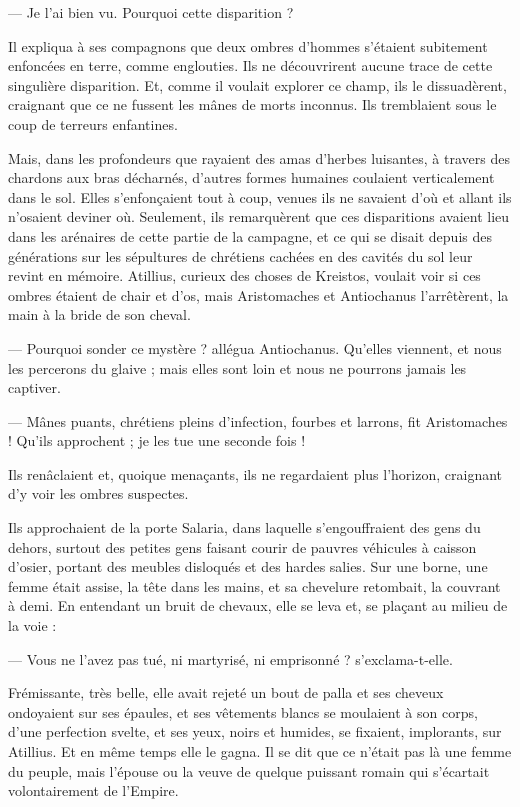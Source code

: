 \documentclass[a4paper, 11pt, oneside, polutonikogreek, french]{article}
\begin{document}
--- Je l'ai bien vu. Pourquoi cette disparition ?

Il expliqua à ses compagnons que deux ombres d'hommes s'étaient subitement enfoncées en terre, comme englouties. Ils ne découvrirent aucune trace de cette singulière disparition. Et, comme il voulait explorer ce champ, ils le dissuadèrent, craignant que ce ne fussent les mânes de morts inconnus. Ils tremblaient sous le coup de terreurs enfantines.

Mais, dans les profondeurs que rayaient des amas d'herbes luisantes, à travers des chardons aux bras décharnés, d'autres formes humaines coulaient verticalement dans le sol. Elles s'enfonçaient tout à coup, venues ils ne savaient d'où et allant ils n'osaient deviner où. Seulement, ils remarquèrent que ces disparitions avaient lieu dans les arénaires de cette partie de la campagne, et ce qui se disait depuis des générations sur les sépultures de chrétiens cachées en des cavités du sol leur revint en mémoire. Atillius, curieux des choses de Kreistos, voulait voir si ces ombres étaient de chair et d'os, mais Aristomaches et Antiochanus l'arrêtèrent, la main à la bride de son cheval.

--- Pourquoi sonder ce mystère ? allégua Antiochanus. Qu'elles viennent, et nous les percerons du glaive ; mais elles sont loin et nous ne pourrons jamais les captiver.

--- Mânes puants, chrétiens pleins d'infection, fourbes et larrons, fit Aristomaches ! Qu'ils approchent ; je les tue une seconde fois !

Ils renâclaient et, quoique menaçants, ils ne regardaient plus l'horizon, craignant d'y voir les ombres suspectes.

Ils approchaient de la porte Salaria, dans laquelle s'engouffraient des gens du dehors, surtout des petites gens faisant courir de pauvres véhicules à caisson d'osier, portant des meubles disloqués et des hardes salies. Sur une borne, une femme était assise, la tête dans les mains, et sa chevelure retombait, la couvrant à demi. En entendant un bruit de chevaux, elle se leva et, se plaçant au milieu de la voie :

--- Vous ne l'avez pas tué, ni martyrisé, ni emprisonné ? s'exclama-t-elle.

Frémissante, très belle, elle avait rejeté un bout de palla et ses cheveux ondoyaient sur ses épaules, et ses vêtements blancs se moulaient à son corps, d'une perfection svelte, et ses yeux, noirs et humides, se fixaient, implorants, sur Atillius. Et en même temps elle le gagna. Il se dit que ce n'était pas là une femme du peuple, mais l'épouse ou la veuve de quelque puissant romain qui s'écartait volontairement de l'Empire.
\end{document}
